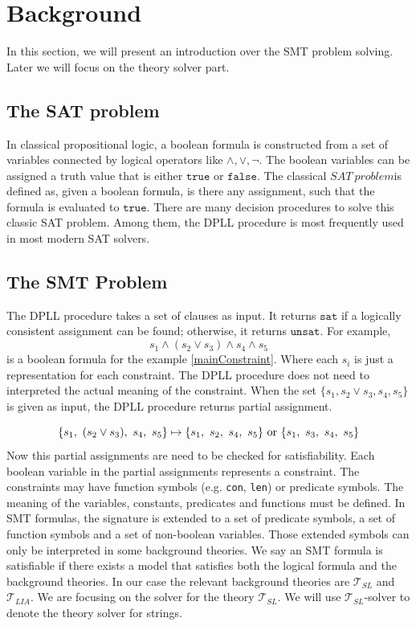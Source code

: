 
\section{Background}
\label{sec:Background}

In this section, we will present an introduction over the SMT problem solving. Later we will focus on the theory solver part.

\subsection{The SAT problem}
In classical propositional logic, a boolean formula is constructed from a set of variables connected by logical operators like \(\wedge, \vee, \neg\). The boolean variables can be assigned a truth value that is either  $\texttt{true}$ or  $\texttt{false}$. The classical $ SAT\ problem$is defined as, 
given a boolean formula, is there any assignment, such that the formula is evaluated to $\texttt{true}$. There are many decision procedures to solve this classic SAT problem. Among them, the DPLL \cite{dpll} procedure is  most frequently used in most modern SAT solvers. 

\subsection{The SMT Problem}
\label{sec:dpllt procedure}
The DPLL procedure takes a set of clauses as input. It returns $\texttt{sat}$ if a logically consistent assignment can be found; otherwise, it returns $\texttt{unsat}$. For example, 
\[
	s_1 \wedge (s_2 \vee s_3) \wedge s_4 \wedge s_5
\] 
	is a boolean formula for the example \ref{mainConstraint}. Where each $s_i$ is  just a representation for each constraint. The DPLL procedure does not need to interpreted the actual meaning of the constraint. When the set $ \{ s_1, s_2 \vee s_3, s_4, s_5 \}$ is given as input, the DPLL procedure returns partial assignment. 
	
	\[
		\{ s_1 ,\ (s_2 \vee s_3),\ s_4, \ s_5 \} \mapsto \{ s_1 ,\ s_2 ,\ s_4, \ s_5 \}\  \textnormal{or}\ \{ s_1 ,\ s_3 ,\ s_4, \ s_5 \} 
	\]
	Now this partial assignments are need to be checked for satisfiability. Each boolean variable in the partial assignments represents a constraint. The constraints may have function symbols (e.g. \texttt{con}, \texttt{len}) or predicate symbols. The meaning of the variables, constants, predicates and functions must be defined. In SMT formulas, the signature is extended to a set of predicate symbols, a set of function symbols and a set of non-boolean variables. Those extended symbols can only be interpreted in some background theories. We say an SMT formula is satisfiable if there exists a model that satisfies both the logical formula and the background theories. In our case the relevant background theories are  $\mathcal{T}_{SL}$ and $\mathcal{T}_{LIA}$. We are focusing on the solver for the theory $\mathcal{T}_{SL}$. We will use $\mathcal{T}_{SL}$-solver to denote the theory solver for strings.

